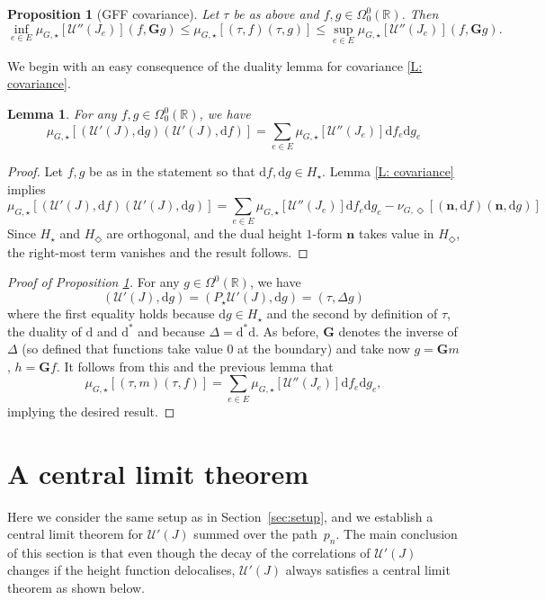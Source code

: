 \documentclass[11pt, reqno]{amsart}
\newtheorem{lemma}[theorem]{Lemma}
\newtheorem{proposition}[theorem]{Proposition}
\numberwithin{equation}{section}
\theoremstyle{definition}
\theoremstyle{remark}
\newcommand{\RR}{\mathbb{R}}
\renewcommand{\d}{\mathrm{d}}
\renewcommand{\c}[1]{\ensuremath{\mathcal{#1}}}
\newcommand{\Green}{\ensuremath{\mathbf{G}}}
\newcommand{\J}{J}
\newcommand{\n}{\mathbf{n}}
\newcommand{\exact}{\star}
\newcommand{\coclosed}{\Diamond}
\newcommand{\Hcycle}{\ensuremath{H_{\star}}}
\newcommand{\Hstar}{\ensuremath{H_{\Diamond}} }
\begin{document}
\begin{proposition}[GFF covariance] \label{P: projected-Gaussian}
	Let $\tau$ be as above and $ f,g \in \Omega^0_0(\RR)$. Then
	\[
			\inf_{e \in E} \mu_{G, \exact}[\c{U}''(\J_e)] (f, \Green g) \leq \mu_{G, \exact}[(\tau, f)(\tau, g)] \leq \sup_{e \in E} \mu_{G, \exact}[\c{U}''(\J_e)] (f, \Green g). 
	\]
\end{proposition}

We begin with an easy consequence of the duality lemma for covariance \ref{L: covariance}.

\begin{lemma}\label{L: spin Guassian dom}
	For any $f,g\in \Omega^0_0(\mathbb R)$, we have	
	\[
		\mu_{G, \exact}[(\c{U}'(\J), \d g)(\c{U}'(\J), \d f)] = \sum_{e \in E}\mu_{G, \exact}[\c{U}''(\J_e)]\d f_e \d g_e
	\]
\end{lemma}

\begin{proof}
	Let $f,g$ be as in the statement so that $\d f, \d g\in \Hcycle$. 
	Lemma \ref{L: covariance} implies
	\[
		\mu_{G, \exact}[(\c{U}'(\J), \d f)(\c{U}'(\J), \d g)] = \sum_{e \in E} \mu_{G, \exact}[\c{U}''(\J_e)]  \d f_e \d g_{e} - \nu_{G, \coclosed}[(\n, \d f)(\n, \d g)]
	\]
	Since $\Hcycle$ and $\Hstar$ are orthogonal, and the dual height $1$-form $\n$ takes value in $\Hstar$, the right-most term vanishes and the result follows. 
\end{proof}

\begin{proof}[Proof of Proposition \ref{P: projected-Gaussian}]
	For any $g \in \Omega^0(\mathbb R)$, we have 
	\[
		(\c{U}'(\J), \d g) = (P_{\exact}\c{U}'(\J), \d g) = (\tau, \Delta g)
	\] 
	where the first equality holds because $\d g \in \Hcycle$ and the second by definition of $\tau$, the duality of $\d$ and $\d^*$ and because $\Delta = \d^*\d$. 
	As before, $\Green$ denotes the inverse of $\Delta$ (so defined that functions take value $0$ at the boundary) and take now $g = \Green m$, $h = \Green f$. 
	It follows from this and the previous lemma that 
	\[
		\mu_{G, \exact}[(\tau, m)(\tau, f)] =  \sum_{e \in E}\mu_{G, \exact}[\c{U}''(\J_e)] \d f_e \d g_e, 
	\]
	implying the desired result. 
\end{proof}


\section{A central limit theorem} \label{sec:CLT}
Here we consider the same setup as in Section~\ref{sec:setup}, and we establish a central limit theorem for $\mathcal U'(J)$ summed over the path~$p_n$.
The main conclusion of this section is that even though the decay of the correlations of $\mathcal U'(J)$ changes if the height function delocalises, $\mathcal U'(J)$ always satisfies a central limit theorem as shown below. 
\end{document}
